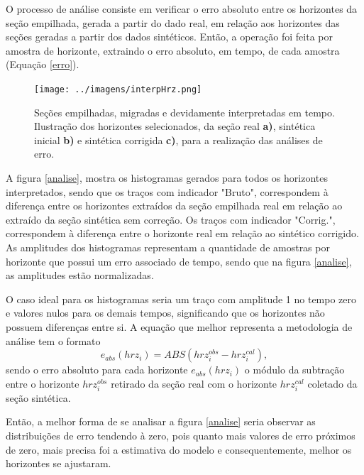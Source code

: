 \documentclass[
	12pt,				%
	openright,			%
	oneside,			%
	a4paper,			%
	english,			%
	brazil				%
	]{abntex2}
\begin{document}
	O processo de análise consiste em verificar o erro absoluto entre os horizontes da seção empilhada, gerada a partir do dado real, em relação aos horizontes das seções geradas a partir dos dados sintéticos. Então, a operação foi feita por amostra de horizonte, extraindo o erro absoluto, em tempo, de cada amostra (Equação \ref{erro}).  
	
	\begin{figure}[htp!]
		\centering
		\texttt{[image: ../imagens/interpHrz.png]}
		\caption{Seções empilhadas, migradas e devidamente interpretadas em tempo. Ilustração dos horizontes selecionados, da seção real \textbf{a)}, sintética inicial \textbf{b)} e sintética corrigida \textbf{c)}, para a realização das análises de erro.}
		\label{hrzs}
	\end{figure}

	A figura \ref{analise}, mostra os histogramas gerados para todos os horizontes interpretados, sendo que os traços com indicador "Bruto", correspondem à diferença entre os horizontes extraídos da seção empilhada real em relação ao extraído da seção sintética sem correção. Os traços com indicador "Corrig.", correspondem à diferença entre o horizonte real em relação ao sintético corrigido. As amplitudes dos histogramas representam a quantidade de amostras por horizonte que possui um erro associado de tempo, sendo que na figura \ref{analise}, as amplitudes estão normalizadas.    

	O caso ideal para os histogramas seria um traço com amplitude 1 no tempo zero e valores nulos para os demais tempos, significando que os horizontes não possuem diferenças entre si. A equação que melhor representa a metodologia de análise tem o formato
%	
	\begin{equation}
		e_{abs}(hrz_i) = ABS(hrz_i^{obs} - hrz_i^{cal}),
		\label{erro}
	\end{equation}
%	   
	\noindent sendo o erro absoluto para cada horizonte $e_{abs}(hrz_i)$ o módulo da subtração entre o horizonte $hrz_i^{obs}$ retirado da seção real com o horizonte $hrz_i^{cal}$ coletado da seção sintética.
	
	Então, a melhor forma de se analisar a figura \ref{analise} seria observar as distribuições de erro tendendo à zero, pois quanto mais valores de erro próximos de zero, mais precisa foi a estimativa do modelo e consequentemente, melhor os horizontes se ajustaram. 
\end{document}
